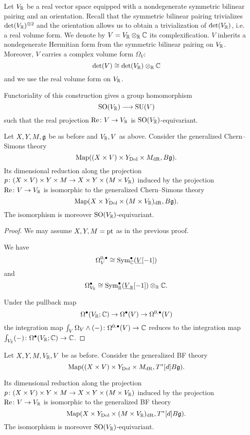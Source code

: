 \documentclass[10pt, oneside]{article}
\renewcommand{\Re}{\mathrm{Re}}
\begin{document}
Let $V_\mathbb R$ be a real vector space equipped with a nondegenerate symmetric bilinear pairing and an orientation. Recall that the symmetric bilinear pairing trivializes $\det(V_\mathbb R)^{\otimes 2}$ and the orientation allows us to obtain a trivialization of $\det(V_\mathbb R)$, i.e. a real volume form. We denote by $V=V_\mathbb R\otimes_{\mathbb R}\mathbb C$ its complexification. $V$ inherits a nondegenerate Hermitian form from the symmetric bilinear pairing on $V_\mathbb R$. Moreover, $V$ carries a complex volume form $\Omega_V$:
\[\det(V)\cong \det(V_\mathbb R)\otimes_{\mathbb R}\mathbb C\]
and we use the real volume form on $V_\mathbb R$.

Functoriality of this construction gives a group homomorphism
\begin{equation}
\mathrm{SO}(V_\mathbb R)\longrightarrow \mathrm{SU}(V)
\label{eq:SOtoSU}
\end{equation}
such that the real projection $\Re\colon V\rightarrow V_\RR$ is $\mathrm{SO}(V_\mathbb R)$-equivariant.

\begin{prop} \label{CS_diml_red_prop}
Let $X,Y,M,\mathfrak g$ be as before and $V_\mathbb R, V$ as above. Consider the generalized Chern--Simons theory
\[\operatorname{Map}((X\times V)\times Y_{\mathrm{Dol}}\times M_{\mathrm{dR}}, B\mathfrak g).\]
Its dimensional reduction along the projection $p\colon (X\times V)\times Y\times M\rightarrow X\times Y\times (M\times V_\mathbb R)$ induced by the projection $\Re\colon V\rightarrow V_\RR$ is isomorphic to the generalized Chern--Simons theory
\[\operatorname{Map}(X\times Y_{\mathrm{Dol}}\times (M\times V_\mathbb R)_{\mathrm{dR}}, B\mathfrak g).\]
The isomorphism is moreover $\mathrm{SO}(V_\mathbb R)$-equivariant.
\end{prop}
\begin{proof}
We may assume $X,Y,M=\operatorname{pt}$ as in the previous proof.

We have
\[\Omega^{0, \bullet}_V\cong {\rm Sym}_\mathbb C^\bullet(\underline{V}[-1])\]
and
\[\Omega^\bullet_{V_\mathbb R}\cong {\rm Sym}_\mathbb R^\bullet(\underline{V}_\mathbb R[-1])\otimes_\mathbb R\mathbb C.\]

Under the pullback map
\[\Omega^\bullet(V_\mathbb R; \mathbb C)\rightarrow \Omega^\bullet(V)\rightarrow \Omega^{0, \bullet}(V)\]
the integration map $\int_V \Omega_V\wedge (-)\colon \Omega^{0, \bullet}(V)\rightarrow \mathbb C$ reduces to the integration map $\int_{V_\mathbb R} (-)\colon \Omega^{\bullet}(V_\mathbb R;\mathbb C)\rightarrow \mathbb C$.  
\end{proof}

\begin{cor}
Let $X, Y, M, V_\mathbb R, V$ be as before. Consider the generalized BF theory
\[\operatorname{Map}((X\times V)\times Y_{\mathrm{Dol}}\times M_{\mathrm{dR}}, T^*[d] B\mathfrak g).\]

Its dimensional reduction along the projection $p\colon (X\times V)\times Y\times M\rightarrow X\times Y\times (M\times V_\mathbb R)$ induced by the projection $\Re\colon V\rightarrow V_\RR$ is isomorphic to the generalized BF theory
\[\operatorname{Map}(X\times Y_{\mathrm{Dol}}\times (M\times V_\mathbb R)_{\mathrm{dR}}, T^*[d] B\mathfrak g).\]
The isomorphism is moreover $\mathrm{SO}(V_\mathbb R)$-equivariant.
\label{cor:BFholomorphicreduction}
\end{cor}
\end{document}
